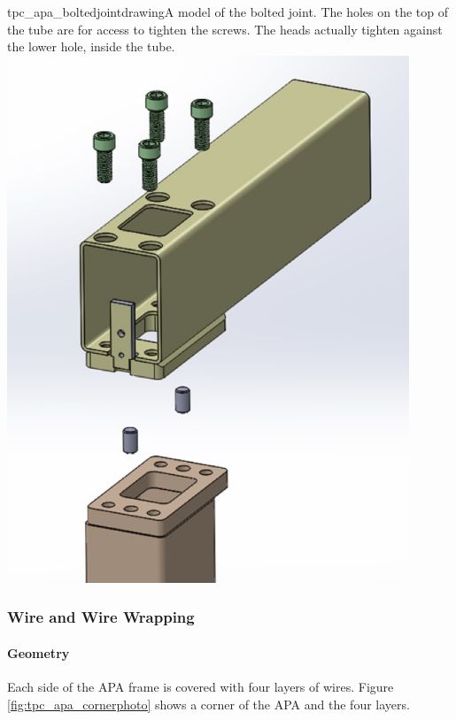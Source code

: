 \begin{cdrfigure}{tpc_apa_boltedjointdrawing}{A model of the bolted joint.  The holes on the top of the tube are for access to tighten the screws.  The heads actually tighten against the lower hole, inside the tube.}
\includegraphics[width=0.9\textwidth]{figures/tpc_apa_boltedjointdrawing.png} 
\end{cdrfigure}




\subsubsection{Wire and Wire Wrapping}
\label{subsubsec:apa_wire_wrap}

\paragraph{Geometry}

Each side of the APA frame is covered with four layers of wires.  Figure \ref{fig:tpc_apa_cornerphoto} shows a corner of the APA and the four layers.


